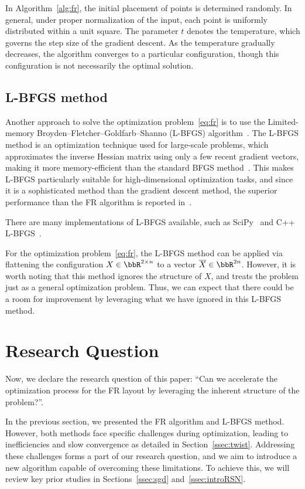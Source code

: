 \documentclass[dvipdfmx,journal]{IEEEtran}
\begin{document}
In Algorithm~\ref{alg:fr}, the initial placement of points is determined randomly. In general, under proper normalization of the input, each point is uniformly distributed within a unit square.
The parameter $t$ denotes the temperature, which governs the step size of the gradient descent. As the temperature gradually decreases, the algorithm converges to a particular configuration, though this configuration is not necessarily the optimal solution.

\subsection{L-BFGS method}\label{ssec:lbfgs}

Another approach to solve the optimization problem~\eqref{eq:fr} is to use the Limited-memory Broyden--Fletcher--Goldfarb--Shanno (L-BFGS) algorithm~\cite{6183577}.
The L-BFGS method is an optimization technique used for large-scale problems, which approximates the inverse Hessian matrix using only a few recent gradient vectors, making it more memory-efficient than the standard BFGS method~\cite{liuLimitedMemoryBFGS1989}.
This makes L-BFGS particularly suitable for high-dimensional optimization tasks, and since it is a sophisticated method than the gradient descent method, the superior performance than the FR algorithm is reported in~\cite{6183577}.

There are many implementations of L-BFGS available, such as SciPy~\cite{2020SciPy-NMeth} and C++ L-BFGS~\cite{qiuYixuanLBFGSpp2024,okazakiChokkanLiblbfgs2024}.

For the optimization problem~\eqref{eq:fr}, the L-BFGS method can be applied via flattening the configuration $X \in \bbR^{2 \times n}$ to a vector $\overline{X} \in \bbR^{2n}$.
However, it is worth noting that this method ignores the structure of $X$, and treats the problem just as a general optimization problem. Thus, we can expect that there could be a room for improvement by leveraging what we have ignored in this L-BFGS method.

\section{Research Question}\label{sec:RQ}

Now, we declare the research question of this paper: ``Can we accelerate the optimization process for the FR layout by leveraging the inherent structure of the problem?''.

In the previous section, we presented the FR algorithm and L-BFGS method.
However, both methods face specific challenges during optimization, leading to inefficiencies and slow convergence as detailed in Section~\ref{ssec:twist}.
Addressing these challenges forms a part of our research question, and we aim to introduce a new algorithm capable of overcoming these limitations. To achieve this, we will review key prior studies in Sections~\ref{ssec:sgd} and~\ref{ssec:introRSN}.
\end{document}
